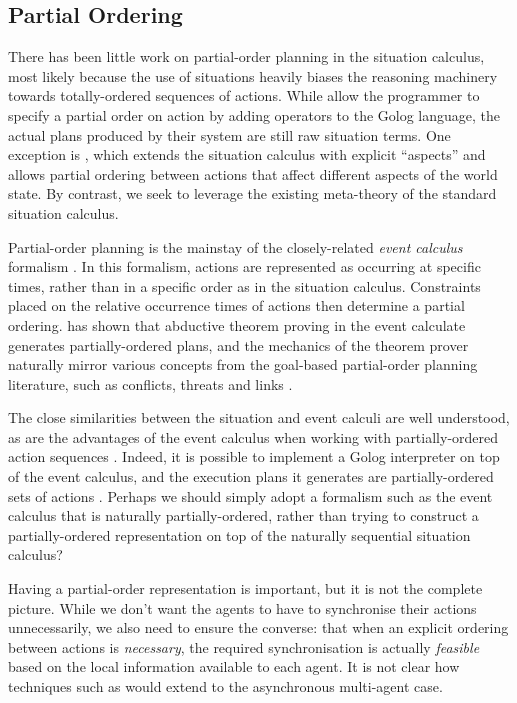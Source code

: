 \subsection{Partial Ordering}

There has been little work on partial-order planning in the situation
calculus, most likely because the use of situations heavily biases
the reasoning machinery towards totally-ordered sequences of actions.
While \citet{son00htn_golog} allow the programmer to specify a partial
order on action by adding operators to the Golog language, the actual
plans produced by their system are still raw situation terms. One
exception is \citep{plaisted97sc_aspect}, which extends the situation
calculus with explicit {}``aspects'' and allows partial ordering
between actions that affect different aspects of the world state.
By contrast, we seek to leverage the existing meta-theory of the standard
situation calculus.

Partial-order planning is the mainstay of the closely-related \emph{event
calculus} formalism \citep{kowalski86event_calculus}. In this formalism,
actions are represented as occurring at specific times, rather than
in a specific order as in the situation calculus. Constraints placed
on the relative occurrence times of actions then determine a partial
ordering. \citet{Shanahan97ec_planning} has shown that abductive
theorem proving in the event calculate generates partially-ordered
plans, and the mechanics of the theorem prover naturally mirror various
concepts from the goal-based partial-order planning literature, such
as conflicts, threats and links \citep{peot92conditional_nonlinear}.

The close similarities between the situation and event calculi are
well understood, as are the advantages of the event calculus when
working with partially-ordered action sequences \citep{belleghem97sitcalc_evtcalc}.
Indeed, it is possible to implement a Golog interpreter on top of
the event calculus, and the execution plans it generates are partially-ordered
sets of actions \citep{pereira04ec_golog}. Perhaps we should simply
adopt a formalism such as the event calculus that is naturally partially-ordered,
rather than trying to construct a partially-ordered representation
on top of the naturally sequential situation calculus?

Having a partial-order representation is important, but it is not
the complete picture. While we don't want the agents to have to synchronise
their actions unnecessarily, we also need to ensure the converse:
that when an explicit ordering between actions is \emph{necessary},
the required synchronisation is actually \emph{feasible} based on
the local information available to each agent. It is not clear how
techniques such as \citep{pereira04ec_golog} would extend to the
asynchronous multi-agent case.

